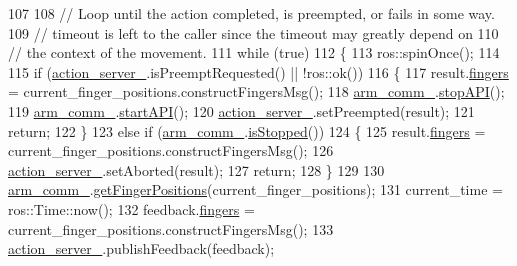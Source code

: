 \begin{DoxyCode}
107 
108         \textcolor{comment}{// Loop until the action completed, is preempted, or fails in some way.}
109         \textcolor{comment}{// timeout is left to the caller since the timeout may greatly depend on}
110         \textcolor{comment}{// the context of the movement.}
111         \textcolor{keywordflow}{while} (\textcolor{keyword}{true})
112         \{
113             ros::spinOnce();
114 
115             \textcolor{keywordflow}{if} (\hyperlink{classjaco_1_1JacoFingersActionServer_a34f6a67ccd8fe1ad2bc75873d20da0f1}{action\_server\_}.isPreemptRequested() || !ros::ok())
116             \{
117                 result.\hyperlink{structjaco__msgs_1_1SetFingersPositionResult___a5c4ac8ab3df0087e2ea584f4b419e91a}{fingers} = current\_finger\_positions.constructFingersMsg();
118                 \hyperlink{classjaco_1_1JacoFingersActionServer_afbddf1665a5e66b79cc79cae0b2badeb}{arm\_comm\_}.\hyperlink{classjaco_1_1JacoComm_a54862830cd6414ae3ae48e46e54bf798}{stopAPI}();
119                 \hyperlink{classjaco_1_1JacoFingersActionServer_afbddf1665a5e66b79cc79cae0b2badeb}{arm\_comm\_}.\hyperlink{classjaco_1_1JacoComm_a6b2a1fabc4e6c30da42c9a5e26757398}{startAPI}();
120                 \hyperlink{classjaco_1_1JacoFingersActionServer_a34f6a67ccd8fe1ad2bc75873d20da0f1}{action\_server\_}.setPreempted(result);
121                 \textcolor{keywordflow}{return};
122             \}
123             \textcolor{keywordflow}{else} \textcolor{keywordflow}{if} (\hyperlink{classjaco_1_1JacoFingersActionServer_afbddf1665a5e66b79cc79cae0b2badeb}{arm\_comm\_}.\hyperlink{classjaco_1_1JacoComm_a872b8033cda5a9fe4ccdca2e89aa03d1}{isStopped}())
124             \{
125                 result.\hyperlink{structjaco__msgs_1_1SetFingersPositionResult___a5c4ac8ab3df0087e2ea584f4b419e91a}{fingers} = current\_finger\_positions.constructFingersMsg();
126                 \hyperlink{classjaco_1_1JacoFingersActionServer_a34f6a67ccd8fe1ad2bc75873d20da0f1}{action\_server\_}.setAborted(result);
127                 \textcolor{keywordflow}{return};
128             \}
129 
130             \hyperlink{classjaco_1_1JacoFingersActionServer_afbddf1665a5e66b79cc79cae0b2badeb}{arm\_comm\_}.\hyperlink{classjaco_1_1JacoComm_a7644bf1154b59bf4d8b97c200284e3fb}{getFingerPositions}(current\_finger\_positions);
131             current\_time = ros::Time::now();
132             feedback.\hyperlink{structjaco__msgs_1_1SetFingersPositionFeedback___ae2565d164d4f0daf1be357023e5d0be2}{fingers} = current\_finger\_positions.constructFingersMsg();
133             \hyperlink{classjaco_1_1JacoFingersActionServer_a34f6a67ccd8fe1ad2bc75873d20da0f1}{action\_server\_}.publishFeedback(feedback);

\end{DoxyCode}
